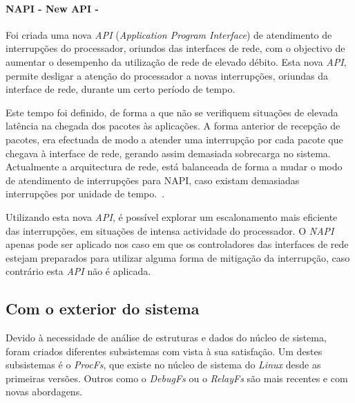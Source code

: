 \paragraph*{NAPI - New API - }


Foi criada uma nova \textit{API} (\textit{Application Program Interface}) de atendimento de interrupções do processador, oriundos das interfaces de rede, com o objectivo de aumentar o desempenho da utilização de rede de elevado débito.
Esta nova \textit{API}, permite desligar a atenção do processador a novas interrupções, oriundas da interface de rede, durante um certo período de tempo.

Este tempo foi definido, de forma a que não se verifiquem situações de elevada latência na chegada dos pacotes às aplicações.
A forma anterior de recepção de pacotes, era efectuada de modo a atender uma interrupção por cada pacote que chegava à interface de rede, gerando assim demasiada sobrecarga no sistema.
Actualmente a arquitectura de rede, está balanceada de forma a mudar o modo de atendimento de interrupções para NAPI, caso existam demasiadas interrupções por unidade de tempo.~\cite{administrator:napi}.

Utilizando esta nova \textit{API}, é possível explorar um escalonamento mais eficiente das interrupções, em situações de intensa actividade do processador.
O \textit{NAPI} apenas pode ser aplicado nos caso em que os controladores das interfaces de rede estejam preparados para utilizar alguma forma de mitigação da interrupção, caso contrário esta \textit{API} não é aplicada.

\subsection{Com o exterior do sistema}
% 

Devido à necessidade de análise de estruturas e dados do núcleo de sistema, foram criados diferentes subsistemas com vista à sua satisfação.
Um destes subsistemas é o \textit{ProcFs}, que existe no núcleo de sistema do \textit{Linux} desde as primeiras versões.
Outros como o \textit{DebugFs} ou o \textit{RelayFs} são mais recentes e com novas abordagens.

